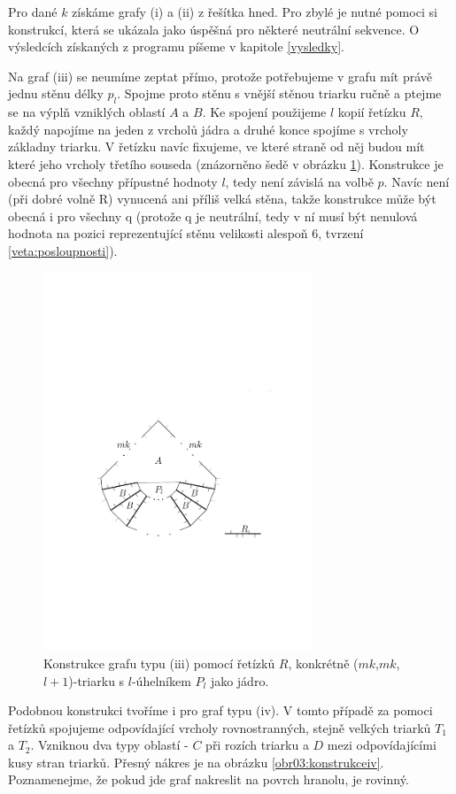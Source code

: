 Pro dané $k$ získáme grafy (i) a (ii) z řešítka hned. Pro zbylé je nutné pomoci si konstrukcí, která se ukázala jako úspěšná pro některé neutrální sekvence. O výsledcích získaných z programu píšeme v kapitole \ref{vysledky}.

Na graf (iii) se neumíme zeptat přímo, protože potřebujeme v grafu mít právě jednu stěnu délky $p_l$. Spojme proto stěnu s vnější stěnou triarku ručně a ptejme se na výplň vzniklých oblastí $A$ a $B$. Ke spojení použijeme $l$ kopií řetízku $R$, každý napojíme na jeden z vrcholů jádra a druhé konce spojíme s  vrcholy základny triarku. V řetízku navíc fixujeme, ve které straně od něj budou mít které jeho vrcholy třetího souseda (znázorněno šedě v obrázku \ref{obr03:konstrukceiii}). Konstrukce je obecná pro všechny přípustné hodnoty $l$, tedy není závislá na volbě $p$. Navíc není (při dobré volně R) vynucená ani příliš velká stěna, takže konstrukce může být obecná i pro všechny q (protože q je neutrální, tedy v ní musí být nenulová hodnota na pozici reprezentující stěnu velikosti alespoň 6, tvrzení \ref{veta:posloupnosti}).

\begin{figure}[h]\centering
\includegraphics[width = 80mm]{../img/iii-construction}
\caption{Konstrukce grafu typu (iii) pomocí řetízků $R$, konkrétně ($mk$,$mk$,$l+1$)-triarku s $l$-úhelníkem $P_l$ jako jádro.}
\label{obr03:konstrukceiii}
\end{figure}

Podobnou konstrukci tvoříme i pro graf typu (iv). V tomto případě za pomoci řetízků spojujeme odpovídající vrcholy rovnostranných, stejně velkých triarků $T_1$ a $T_2$. Vzniknou dva typy oblastí - $C$ při rozích triarku a $D$ mezi odpovídajícími kusy stran triarků. Přesný nákres je na obrázku \ref{obr03:konstrukceiv}. Poznamenejme, že pokud jde graf nakreslit na povrch hranolu, je rovinný. 

